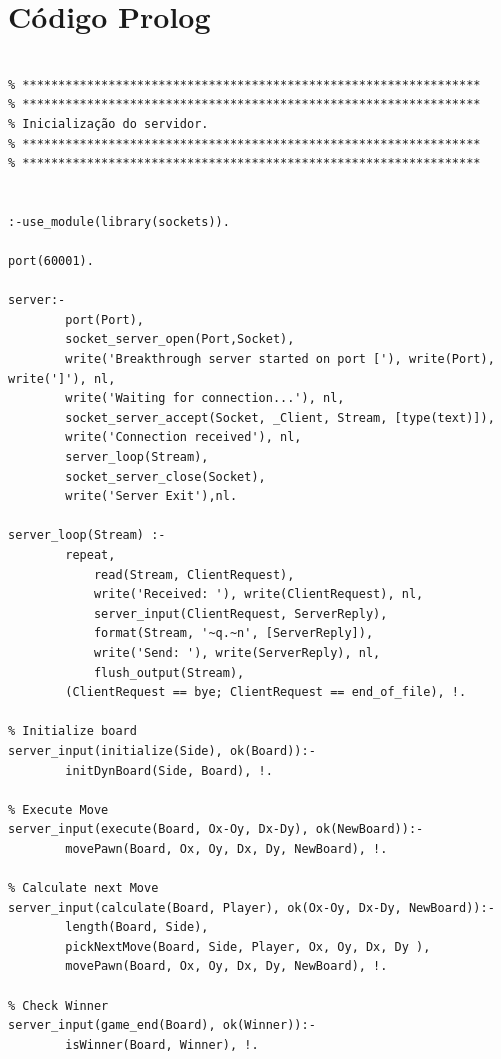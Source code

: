\documentclass[15pt,a4paper]{article}
\begin{document}
\nocite{breakSite}
\nocite{tut1}
\nocite{tut2}


\newpage

\appendix
\section{Código Prolog}


\begin{lstlisting}

% ****************************************************************
% ****************************************************************
% Inicialização do servidor.
% ****************************************************************
% ****************************************************************


:-use_module(library(sockets)).

port(60001).

server:-
		port(Port),
		socket_server_open(Port,Socket),
		write('Breakthrough server started on port ['), write(Port), write(']'), nl,
		write('Waiting for connection...'), nl,
		socket_server_accept(Socket, _Client, Stream, [type(text)]),
		write('Connection received'), nl,
		server_loop(Stream),
		socket_server_close(Socket),
		write('Server Exit'),nl.

server_loop(Stream) :-
		repeat,
			read(Stream, ClientRequest),
			write('Received: '), write(ClientRequest), nl, 
			server_input(ClientRequest, ServerReply),
			format(Stream, '~q.~n', [ServerReply]),
			write('Send: '), write(ServerReply), nl, 
			flush_output(Stream),
		(ClientRequest == bye; ClientRequest == end_of_file), !.

% Initialize board
server_input(initialize(Side), ok(Board)):- 
		initDynBoard(Side, Board), !.

% Execute Move	
server_input(execute(Board, Ox-Oy, Dx-Dy), ok(NewBoard)):- 
		movePawn(Board, Ox, Oy, Dx, Dy, NewBoard), !.

% Calculate next Move
server_input(calculate(Board, Player), ok(Ox-Oy, Dx-Dy, NewBoard)):- 
		length(Board, Side),
		pickNextMove(Board, Side, Player, Ox, Oy, Dx, Dy ),
		movePawn(Board, Ox, Oy, Dx, Dy, NewBoard), !.
	
% Check Winner
server_input(game_end(Board), ok(Winner)):- 
		isWinner(Board, Winner), !.
	

\end{lstlisting}
\end{document}
